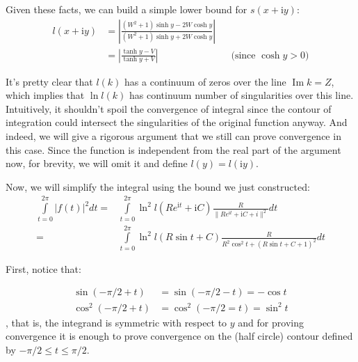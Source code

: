 \documentclass{gCOV2e}
\theoremstyle{plain}%
\theoremstyle{definition}
\theoremstyle{remark}
\begin{document}
Given these facts, we can build a simple lower bound for $s(x + \mathrm{i} y)$:
\begin{align*}
l(x + \mathrm{i} y)
   &= \left|\frac{(W^2 + 1) \sinh y - 2 W \cosh y}{(W^2 + 1) \sinh y + 2 W \cosh y}\right|
\\ &= \left|\frac{\tanh y - V}{\tanh y + V}\right| && \text{(since $\cosh y > 0$)}
\end{align*}

It's pretty clear that $l(k)$ has a continuum of zeros over the line $\operatorname{Im} k = Z$, which implies that $\ln l(k)$ has continuum number of singularities over this line. Intuitively, it shouldn't spoil the convergence of integral since the contour of integration could intersect the singularities of the original function anyway. And indeed, we will give a rigorous argument that we still can prove convergence in this case. Since the function is independent from the real part of the argument now, for brevity, we will omit it and define $l(y) = l(\mathrm{i} y)$.

Now, we will simplify the integral using the bound we just constructed:
\begin{align*}
       \int\limits_{t=0}^{2 \pi} \left|f(t)\right|^2 dt
   = & \int\limits_{t = 0}^{2 \pi} \ln^2 l(R e^{\mathrm{i} t} + \mathrm{i} C) \frac{R}{\|R e^{\mathrm{i} t} + \mathrm{i} C + i\|^2} dt
\\ = & \int\limits_{t = 0}^{2 \pi} \ln^2 l(R \sin t + C) \frac{R}{R^2 \cos^2 t + (R \sin t + C + 1)^2} dt
\end{align*}

First, notice that:

\begin{equation*}
\begin{aligned}
   \sin(-\pi/2 + t)   &= \sin(-\pi/2 - t) = - \cos t
\\ \cos^2(-\pi/2 + t) &= \cos^2(-\pi/2 = t) = \sin^2 t
\end{aligned}
\end{equation*}
, that is, the integrand is symmetric with respect to $y$ and for proving convergence it is enough to prove convergence on the (half circle) contour defined by $-\pi/2 \le t \le \pi/2$.
\end{document}
